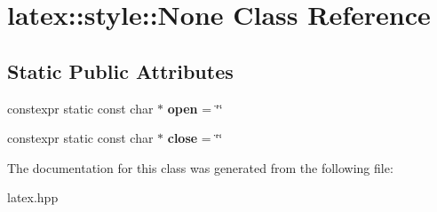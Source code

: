 \hypertarget{classlatex_1_1style_1_1None}{\section{latex\-:\-:style\-:\-:\-None \-Class \-Reference}
\label{classlatex_1_1style_1_1None}
}
\subsection*{\-Static \-Public \-Attributes}
\begin{DoxyCompactItemize}
\item 
\hypertarget{classlatex_1_1style_1_1None_a742bf0986955725b3cbe15bbb889cec9}{constexpr static const char $\ast$ {\bfseries open} = \char`\"{}\char`\"{}}\label{classlatex_1_1style_1_1None_a742bf0986955725b3cbe15bbb889cec9}

\item 
\hypertarget{classlatex_1_1style_1_1None_aafb4d115dc87e0ae25cc5a38a49e9f38}{constexpr static const char $\ast$ {\bfseries close} = \char`\"{}\char`\"{}}\label{classlatex_1_1style_1_1None_aafb4d115dc87e0ae25cc5a38a49e9f38}

\end{DoxyCompactItemize}


\-The documentation for this class was generated from the following file\-:\begin{DoxyCompactItemize}
\item 
latex.\-hpp\end{DoxyCompactItemize}
